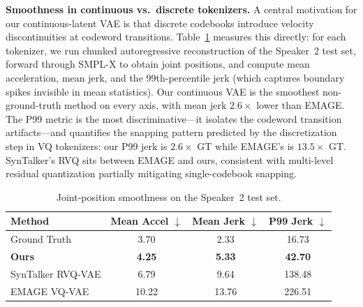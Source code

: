 \noindent \textbf{Smoothness in continuous vs.\ discrete tokenizers.}
A central motivation for our continuous-latent VAE is that discrete codebooks introduce velocity discontinuities at codeword transitions.
Table~\ref{tab:smoothness} measures this directly: for each tokenizer, we run chunked autoregressive reconstruction of the Speaker~2 test set, forward through SMPL-X to obtain joint positions, and compute mean acceleration, mean jerk, and the 99th-percentile jerk (which captures boundary spikes invisible in mean statistics).
Our continuous VAE is the smoothest non-ground-truth method on every axis, with mean jerk $2.6{\times}$ lower than EMAGE.
The P99 metric is the most discriminative---it isolates the codeword transition artifacts---and quantifies the snapping pattern predicted by the discretization step in VQ tokenizers: our P99 jerk is $2.6{\times}$ GT while EMAGE's is $13.5{\times}$ GT.
SynTalker's RVQ sits between EMAGE and ours, consistent with multi-level residual quantization partially mitigating single-codebook
snapping.

\begin{table}[t]
\scriptsize
\caption{Joint-position smoothness on the Speaker~2 test set.}
\label{tab:smoothness}
\begin{tabular}{lccc}
\toprule
\textbf{Method} & \textbf{Mean Accel $\downarrow$} & \textbf{Mean Jerk $\downarrow$} & \textbf{P99 Jerk $\downarrow$} \\
\midrule
Ground Truth          & 3.70  & 2.33  & 16.73  \\
\textbf{Ours}         & \textbf{4.25}  & \textbf{5.33}  & \textbf{42.70}  \\
SynTalker RVQ-VAE     & 6.79  & 9.64  & 138.48 \\
EMAGE VQ-VAE          & 10.22 & 13.76 & 226.51 \\
\bottomrule
\end{tabular}
\end{table}

